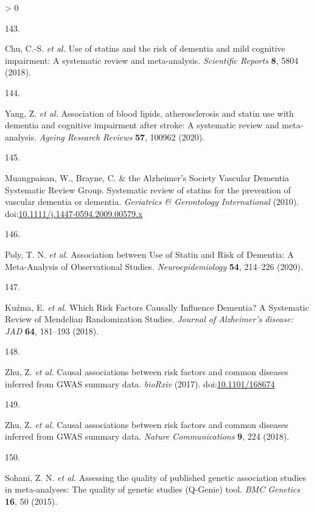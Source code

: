 \documentclass[a4paper, twoside]{templates/ociamthesis}
\newlength{\cslhangindent}
\newlength{\csllabelwidth}
\newenvironment{CSLReferences}[3] %
 {%
  \setlength{\parindent}{0pt}
  \ifodd #1 \everypar{\setlength{\hangindent}{\cslhangindent}}\ignorespaces\fi
  \ifnum #2 > 0
  \setlength{\parskip}{#2\baselineskip}
  \fi
 }%
 {}
\newcommand{\CSLLeftMargin}[1]{\parbox[t]{\maxof{\widthof{#1}}{\csllabelwidth}}{#1}}
\newcommand{\CSLRightInline}[1]{\parbox[t]{\linewidth - \csllabelwidth}{#1}}
\begin{document}
\begin{CSLReferences}{0}{0}
\leavevmode\hypertarget{ref-chu2018}{}%
\CSLLeftMargin{143. }
\CSLRightInline{Chu, C.-S. \emph{et al.} Use of statins and the risk of dementia and mild cognitive impairment: {A} systematic review and meta-analysis. \emph{Scientific Reports} \textbf{8}, 5804 (2018).}

\leavevmode\hypertarget{ref-yang2020}{}%
\CSLLeftMargin{144. }
\CSLRightInline{Yang, Z. \emph{et al.} Association of blood lipids, atherosclerosis and statin use with dementia and cognitive impairment after stroke: {A} systematic review and meta-analysis. \emph{Ageing Research Reviews} \textbf{57}, 100962 (2020).}

\leavevmode\hypertarget{ref-muangpaisan2010}{}%
\CSLLeftMargin{145. }
\CSLRightInline{Muangpaisan, W., Brayne, C. \& the Alzheimer's Society Vascular Dementia Systematic Review Group. Systematic review of statins for the prevention of vascular dementia or dementia. \emph{Geriatrics \& Gerontology International} (2010). doi:\href{https://doi.org/10.1111/j.1447-0594.2009.00579.x}{10.1111/j.1447-0594.2009.00579.x}}

\leavevmode\hypertarget{ref-poly2020}{}%
\CSLLeftMargin{146. }
\CSLRightInline{Poly, T. N. \emph{et al.} Association between {Use} of {Statin} and {Risk} of {Dementia}: {A Meta}-{Analysis} of {Observational Studies}. \emph{Neuroepidemiology} \textbf{54}, 214--226 (2020).}

\leavevmode\hypertarget{ref-kuzma2018a}{}%
\CSLLeftMargin{147. }
\CSLRightInline{Kuźma, E. \emph{et al.} Which {Risk Factors Causally Influence Dementia}? {A Systematic Review} of {Mendelian Randomization Studies}. \emph{Journal of Alzheimer's disease: JAD} \textbf{64}, 181--193 (2018).}

\leavevmode\hypertarget{ref-zhu2017}{}%
\CSLLeftMargin{148. }
\CSLRightInline{Zhu, Z. \emph{et al.} Causal associations between risk factors and common diseases inferred from {GWAS} summary data. \emph{bioRxiv} (2017). doi:\href{https://doi.org/10.1101/168674}{10.1101/168674}}

\leavevmode\hypertarget{ref-zhu2018}{}%
\CSLLeftMargin{149. }
\CSLRightInline{Zhu, Z. \emph{et al.} Causal associations between risk factors and common diseases inferred from {GWAS} summary data. \emph{Nature Communications} \textbf{9}, 224 (2018).}

\leavevmode\hypertarget{ref-sohani2015}{}%
\CSLLeftMargin{150. }
\CSLRightInline{Sohani, Z. N. \emph{et al.} Assessing the quality of published genetic association studies in meta-analyses: The quality of genetic studies ({Q}-{Genie}) tool. \emph{BMC Genetics} \textbf{16}, 50 (2015).}


\end{CSLReferences}
\end{document}
